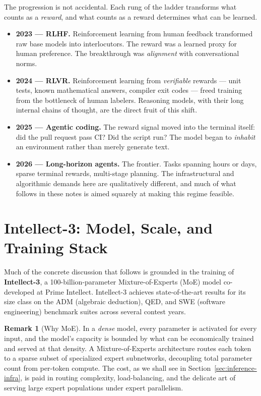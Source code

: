 \documentclass[11pt,a4paper]{article}
\theoremstyle{definition}
\newtheorem{remark}[definition]{Remark}
\theoremstyle{plain}
\begin{document}
\noindent The progression is not accidental. Each rung of the ladder transforms what counts as a \emph{reward}, and what counts as a reward determines what can be learned.

\begin{itemize}
  \item \textbf{2023 --- RLHF.} Reinforcement learning from human feedback transformed raw base models into interlocutors. The reward was a learned proxy for human preference. The breakthrough was \emph{alignment} with conversational norms.
  \item \textbf{2024 --- RLVR.} Reinforcement learning from \emph{verifiable} rewards --- unit tests, known mathematical answers, compiler exit codes --- freed training from the bottleneck of human labelers. Reasoning models, with their long internal chains of thought, are the direct fruit of this shift.
  \item \textbf{2025 --- Agentic coding.} The reward signal moved into the terminal itself: did the pull request pass CI? Did the script run? The model began to \emph{inhabit} an environment rather than merely generate text.
  \item \textbf{2026 --- Long-horizon agents.} The frontier. Tasks spanning hours or days, sparse terminal rewards, multi-stage planning. The infrastructural and algorithmic demands here are qualitatively different, and much of what follows in these notes is aimed squarely at making this regime feasible.
\end{itemize}

\section{Intellect-3: Model, Scale, and Training Stack}

Much of the concrete discussion that follows is grounded in the training of \textbf{Intellect-3}, a 100-billion-parameter Mixture-of-Experts (MoE) model co-developed at Prime Intellect. Intellect-3 achieves state-of-the-art results for its size class on the ADM (algebraic deduction), QED, and SWE (software engineering) benchmark suites across several contest years.

\begin{remark}[Why MoE]
In a \emph{dense} model, every parameter is activated for every input, and the model's capacity is bounded by what can be economically trained and served at that density. A Mixture-of-Experts architecture routes each token to a sparse subset of specialized expert subnetworks, decoupling total parameter count from per-token compute. The cost, as we shall see in Section~\ref{sec:inference-infra}, is paid in routing complexity, load-balancing, and the delicate art of serving large expert populations under expert parallelism.
\end{remark}
\end{document}
